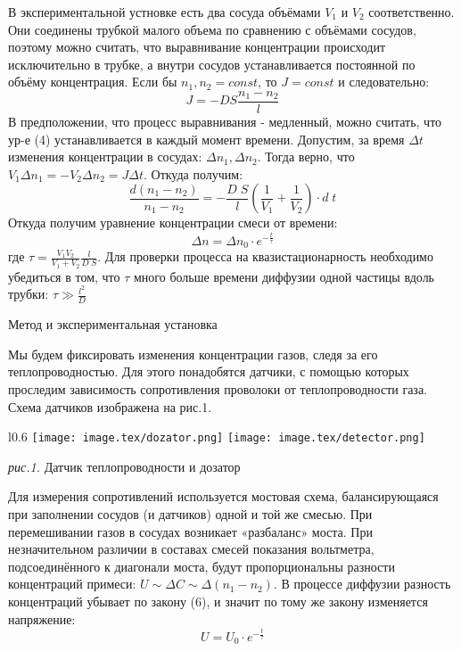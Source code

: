 \documentclass{article}
\begin{document}
В экспериментальной устновке есть два сосуда объёмами \(V_{1}\) и \(V_{2}\) соответственно. Они соединены трубкой малого объема по сравнению с объёмами сосудов, поэтому можно считать, что выравнивание концентрации происходит исключительно в трубке, а внутри сосудов устанавливается постоянной по объёму концентрация. Если бы \(n_{1}, n_{2} = const\), то \(J = const\) и следовательно:
\begin{equation}
    J = -DS\frac{n_{1} - n_{2}}{l}
\end{equation}
В предположении, что процесс выравнивания - медленный, можно считать, что ур-е (4) устанавливается в каждый момент времени. Допустим, за время \(\Delta t\) изменения концентрации в сосудах: \(\Delta n_{1}, \Delta n_{2}\). Тогда верно, что \(V_{1} \Delta n_{1} =- V_{2} \Delta n_{2} = J \Delta t\). Откуда получим:
\begin{equation}
    \frac{d(n_{1} - n_{2})}{n_{1} - n_{2}} = -\frac{D\;S}{l} \left(\frac{1}{V_{1}} + \frac{1}{V_{2}}\right) \cdot d\;t
\end{equation}
Откуда получим уравнение концентрации смеси от времени:
\begin{equation}
    \Delta n = \Delta n_{0} \cdot e^{- \frac{t}{\tau}}
\end{equation}
где \(\tau = \frac{V_{1} V_{2}}{V_{1} + V_{2}}\frac{l}{D\;S}\). Для проверки процесса на квазистационарность необходимо убедиться в том, что \(\tau\) много больше времени диффузии одной частицы вдоль трубки: \(\tau \gg \frac{l^{2}}{D}\)

\begin{center}
    \raggedleft
    {
        \LARGE {Метод и экспериментальная установка}
    }
    \hline
    \hline
\end{center}

Мы будем фиксировать изменения концентрации газов, следя за его теплопроводностью. Для этого понадобятся датчики, с помощью которых проследим зависимость сопротивления проволоки от теплопроводности газа. Схема датчиков изображена на рис.1.

\begin{wrapfigure}{l}{0.6\textwidth}
    \centering
    \texttt{[image: image.tex/dozator.png]}
    \texttt{[image: image.tex/detector.png]}

    \textit{рис.1.} Датчик теплопроводности и дозатор
\end{wrapfigure}


Для измерения сопротивлений используется мостовая схема, балансирующаяся при заполнении сосудов (и датчиков) одной и той же смесью. При перемешивании газов в сосудах возникает «разбаланс» моста. При незначительном различии в составах смесей показания вольтметра, подсоединённого к диагонали моста, будут пропорциональны разности концентраций примеси: \(U \sim \Delta C \sim \Delta (n_{1} - n_{2})\). В процессе диффузии разность концентраций убывает по закону (6), и значит по тому же закону изменяется напряжение:
\begin{equation}
    U = U_{0} \cdot e^{- \frac{t}{\tau}}
\end{equation}
\end{document}
